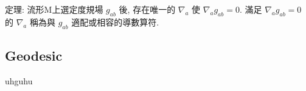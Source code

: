 \documentclass{article}
\begin{document}
\begin{CJK}{UTF8}{bsmi}
定理: 流形M上選定度規場 $g_{ab}$ 後, 存在唯一的 $\nabla_a$ 使 $\nabla_a g_{ab}=0$. 滿足 $\nabla_a g_{ab}=0$ 的 $\nabla_a$ 稱為與 $g_{ab}$ 適配或相容的導數算符.

  
\subsection{Geodesic}
uhguhu























































\end{CJK}		
\end{document}
